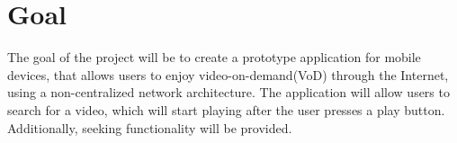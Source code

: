 \section{Goal}
The goal of the project will be to create a prototype application for mobile devices, that allows users to enjoy video-on-demand(VoD) through the Internet, using a non-centralized network architecture. The application will allow users to search for a video, which will start playing after the user presses a play button. Additionally, seeking functionality will be provided.
